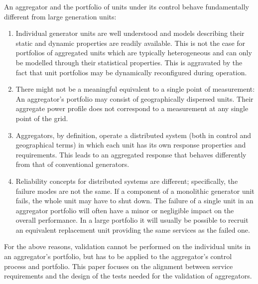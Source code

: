 An aggregator and the portfolio of units under its control behave fundamentally different from large generation units:
\begin{enumerate}
\item Individual generator units are well understood and models describing their static and dynamic properties are readily available. This is not the case for portfolios of aggregated units which are typically heterogeneous and can only be modelled through their statistical properties. This is aggravated by the fact that unit portfolios may be dynamically reconfigured during operation.
\item There might not be a meaningful equivalent to a single point of measurement: An aggregator's portfolio may consist of geographically dispersed units. Their aggregate power profile does not correspond to a measurement at any single point of the grid.
\item Aggregators, by definition, operate a distributed system (both in control and geographical terms) in which each unit has its own response properties and requirements. This leads to an aggregated response that behaves differently from that of conventional generators.
\item Reliability concepts for distributed systems are different; specifically, the failure modes are not the same. If a component of a monolithic generator unit fails, the whole unit may have to shut down. The failure of a single unit in an aggregator portfolio will often have a minor or negligible impact on the overall performance. In a large portfolio it will usually be possible to recruit an equivalent replacement unit providing the same services as the failed one.
\end{enumerate}

For the above reasons, validation cannot be performed on the individual units in an aggregator's portfolio, but has to be applied to the aggregator's control process and portfolio. This paper focuses on the alignment between service requirements and the design of the tests needed for the validation of aggregators. 

